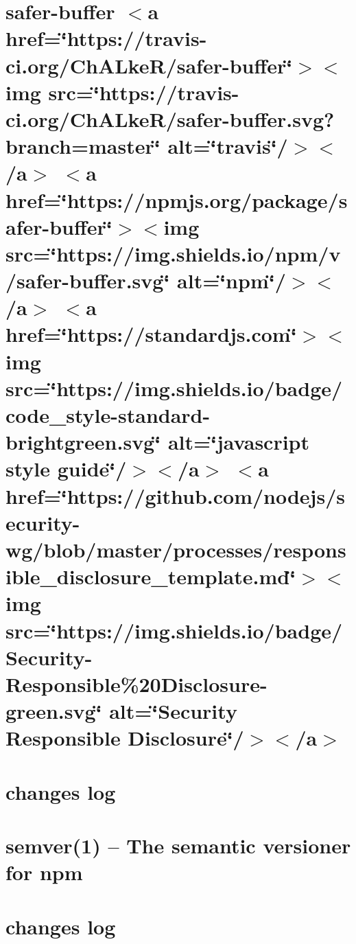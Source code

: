 \let\mypdfximage\pdfximage\def\pdfximage{\immediate\mypdfximage}\documentclass[twoside]{book}
\newcommand{\+}{\discretionary{\mbox{\scriptsize$\hookleftarrow$}}{}{}}
\begin{document}
\chapter{safer-\/buffer $<$a href=\char`\"{}https\+://travis-\/ci.\+org/\+Ch\+A\+Lke\+R/safer-\/buffer\char`\"{}$>$$<$img src=\char`\"{}https\+://travis-\/ci.\+org/\+Ch\+A\+Lke\+R/safer-\/buffer.\+svg?branch=master\char`\"{} alt=\char`\"{}travis\char`\"{}/$>$$<$/a$>$ $<$a href=\char`\"{}https\+://npmjs.\+org/package/safer-\/buffer\char`\"{}$>$$<$img src=\char`\"{}https\+://img.\+shields.\+io/npm/v/safer-\/buffer.\+svg\char`\"{} alt=\char`\"{}npm\char`\"{}/$>$$<$/a$>$ $<$a href=\char`\"{}https\+://standardjs.\+com\char`\"{}$>$$<$img src=\char`\"{}https\+://img.\+shields.\+io/badge/code\+\_\+style-\/standard-\/brightgreen.\+svg\char`\"{} alt=\char`\"{}javascript style guide\char`\"{}/$>$$<$/a$>$ $<$a href=\char`\"{}https\+://github.\+com/nodejs/security-\/wg/blob/master/processes/responsible\+\_\+disclosure\+\_\+template.\+md\char`\"{}$>$$<$img src=\char`\"{}https\+://img.\+shields.\+io/badge/\+Security-\/\+Responsible\%20\+Disclosure-\/green.\+svg\char`\"{} alt=\char`\"{}\+Security Responsible Disclosure\char`\"{}/$>$$<$/a$>$}
\label{md__c_1__git_hub__p_r_o_y_e_c_t_o-_i_i_i-_g_o_t_rest-api_node_modules_safer-buffer__readme}

\chapter{changes log}
\label{md__c_1__git_hub__p_r_o_y_e_c_t_o-_i_i_i-_g_o_t_rest-api_node_modules_semver__c_h_a_n_g_e_l_o_g}

\chapter{semver(1) -- The semantic versioner for npm}
\label{md__c_1__git_hub__p_r_o_y_e_c_t_o-_i_i_i-_g_o_t_rest-api_node_modules_semver__r_e_a_d_m_e}

\chapter{changes log}
\label{md__c_1__git_hub__p_r_o_y_e_c_t_o-_i_i_i-_g_o_t_rest-api_node_modules_semver-diff_node_modules_semver__c_h_a_n_g_e_l_o_g}

\end{document}
